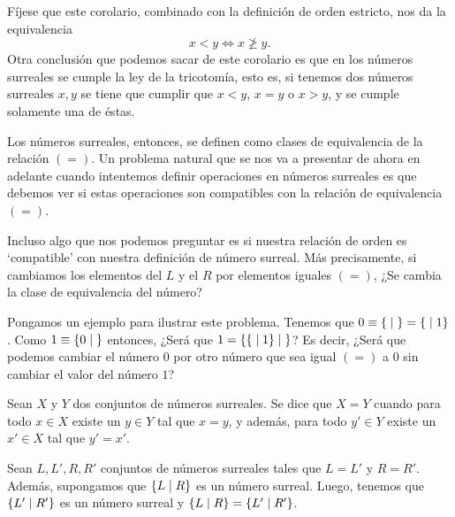     F\'ijese que este corolario, combinado con la definici\'on de orden estricto, nos da la equivalencia 
    \[
        x < y\Leftrightarrow x \not\ge y.
    \]
    Otra conclusi\'on que podemos sacar de este corolario es que en los n\'umeros surreales se cumple la ley de la tricotom\'ia, esto es, si tenemos dos n\'umeros surreales $x,y$ se tiene que cumplir que $x < y$, $x = y$ o $x > y$, y se cumple solamente una de \'estas.

    Los n\'umeros surreales, entonces, se definen como clases de equivalencia de la relaci\'on $(=)$. Un problema natural que se nos va a presentar de ahora en adelante cuando intentemos definir operaciones en n\'umeros surreales es que debemos ver si estas operaciones son compatibles con la relaci\'on de equivalencia $(=)$.    

    Incluso algo que nos podemos preguntar es si nuestra relaci\'on de orden es `compatible' con nuestra definici\'on de n\'umero surreal. M\'as precisamente, si cambiamos los elementos del $L$ y el $R$ por elementos iguales $(=)$, ¿Se cambia la clase de equivalencia del n\'umero?

    Pongamos un ejemplo para ilustrar este problema. Tenemos que $0\equiv \left\{\;\middle|\; \right\} = \left\{\;\middle|\; 1\right\}$. Como $1\equiv \left\{0\;\middle|\; \right\}$ entonces, ¿Ser\'a que $1 = \left\{\left\{\;\middle|\; 1\right\}\;\middle|\; \right\}$? Es decir, ¿Ser\'a que podemos cambiar el n\'umero $0$ por otro n\'umero que sea igual $(=)$ a $0$ sin cambiar el valor del n\'umero $1$?

    \begin{definition}
        Sean $X$ y $Y$ dos conjuntos de n\'umeros surreales. Se dice que $X=Y$ cuando para todo $x\in X$ existe un $y\in Y$ tal que $x=y$, y adem\'as, para todo $y'\in Y$ existe un $x'\in X$ tal que $y'=x'$.
    \end{definition}

    \begin{theorem}
        Sean $L,L',R, R'$ conjuntos de n\'umeros surreales tales que $L = L'$ y $R = R'$. Adem\'as, supongamos que $\left\{L\;\middle|\; R\right\}$ es un n\'umero surreal. Luego, tenemos que $\left\{L'\;\middle|\; R'\right\}$ es un n\'umero surreal y $\left\{L\;\middle|\; R\right\} = \left\{L'\;\middle|\; R'\right\}$.
    \end{theorem}

